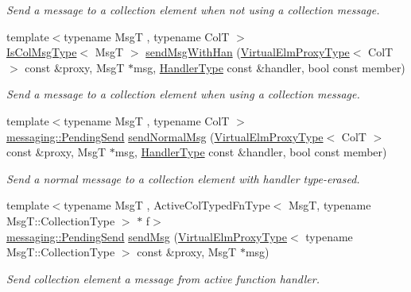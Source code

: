 \begin{DoxyCompactItemize}
\begin{DoxyCompactList}\small\item\em Send a message to a collection element when not using a collection message. \end{DoxyCompactList}\item 
{\footnotesize template$<$typename MsgT , typename ColT $>$ }\\\hyperlink{structvt_1_1vrt_1_1collection_1_1_collection_manager_a21c21612c806016788057aeab142af20}{Is\+Col\+Msg\+Type}$<$ MsgT $>$ \hyperlink{structvt_1_1vrt_1_1collection_1_1_collection_manager_a7be0a9b42876d4eb28b26eccb37351a3}{send\+Msg\+With\+Han} (\hyperlink{namespacevt_1_1vrt_a620a5c8c59d13e513f690c74b4af516f}{Virtual\+Elm\+Proxy\+Type}$<$ ColT $>$ const \&proxy, MsgT $\ast$msg, \hyperlink{namespacevt_af64846b57dfcaf104da3ef6967917573}{Handler\+Type} const \&handler, bool const member)
\begin{DoxyCompactList}\small\item\em Send a message to a collection element when using a collection message. \end{DoxyCompactList}\item 
{\footnotesize template$<$typename MsgT , typename ColT $>$ }\\\hyperlink{structvt_1_1messaging_1_1_pending_send}{messaging\+::\+Pending\+Send} \hyperlink{structvt_1_1vrt_1_1collection_1_1_collection_manager_a9b58618d5d3eec7ac198b7c465288599}{send\+Normal\+Msg} (\hyperlink{namespacevt_1_1vrt_a620a5c8c59d13e513f690c74b4af516f}{Virtual\+Elm\+Proxy\+Type}$<$ ColT $>$ const \&proxy, MsgT $\ast$msg, \hyperlink{namespacevt_af64846b57dfcaf104da3ef6967917573}{Handler\+Type} const \&handler, bool const member)
\begin{DoxyCompactList}\small\item\em Send a normal message to a collection element with handler type-\/erased. \end{DoxyCompactList}\item 
{\footnotesize template$<$typename MsgT , Active\+Col\+Typed\+Fn\+Type$<$ Msg\+T, typename Msg\+T\+::\+Collection\+Type $>$ $\ast$ f$>$ }\\\hyperlink{structvt_1_1messaging_1_1_pending_send}{messaging\+::\+Pending\+Send} \hyperlink{structvt_1_1vrt_1_1collection_1_1_collection_manager_a3165b258fab15c35985b3f9b8ef0dbe7}{send\+Msg} (\hyperlink{namespacevt_1_1vrt_a620a5c8c59d13e513f690c74b4af516f}{Virtual\+Elm\+Proxy\+Type}$<$ typename Msg\+T\+::\+Collection\+Type $>$ const \&proxy, MsgT $\ast$msg)
\begin{DoxyCompactList}\small\item\em Send collection element a message from active function handler. \end{DoxyCompactList}\item 

\end{DoxyCompactItemize}
